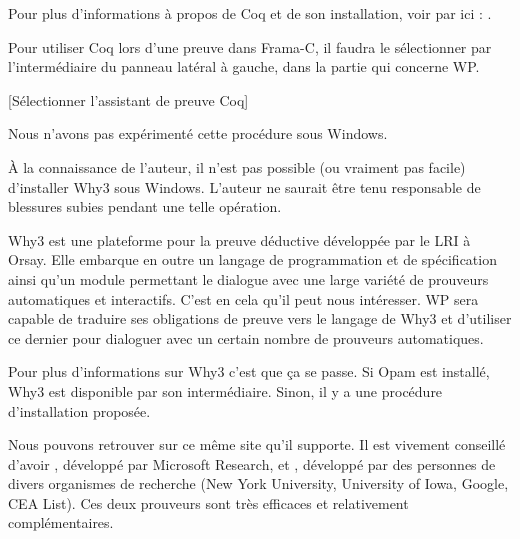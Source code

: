 \documentclass[middle]{zmdocument}
\begin{document}
Pour plus d'informations à propos de Coq et de son installation, voir par 
ici : .



Pour utiliser Coq lors d'une preuve dans Frama-C, il faudra le sélectionner 
par l'intermédiaire du panneau latéral à gauche, dans la partie qui concerne
WP.



[Sélectionner l'assistant de preuve Coq]


\begin{Information}
Nous n'avons pas expérimenté cette procédure sous Windows.
\end{Information}




\begin{Warning}
À la connaissance de l'auteur, il n'est pas possible (ou vraiment pas facile) 
d'installer Why3 sous Windows.
L'auteur ne saurait être tenu responsable de blessures subies
pendant une telle opération.
\end{Warning}


Why3 est une plateforme pour la preuve déductive développée par le LRI à Orsay. 
Elle embarque en outre un langage de programmation et de spécification ainsi 
qu'un module permettant le dialogue avec une large variété de prouveurs 
automatiques et interactifs. C'est en cela qu'il peut nous intéresser. WP sera
capable de traduire ses obligations de preuve vers le langage de Why3 et 
d'utiliser ce dernier pour dialoguer avec un certain nombre de prouveurs 
automatiques.



Pour plus d'informations sur Why3 c'est  que 
ça se passe. Si Opam est installé, Why3 est disponible par son 
intermédiaire. Sinon, il y a une procédure d'installation proposée.



Nous pouvons retrouver sur ce même site 
 qu'il supporte.
Il est vivement conseillé d'avoir ,
développé par Microsoft Research, et ,
développé par des personnes de divers organismes de recherche (New York 
University, University of Iowa, Google, CEA List). Ces deux prouveurs sont très
efficaces et relativement complémentaires.
\end{document}
